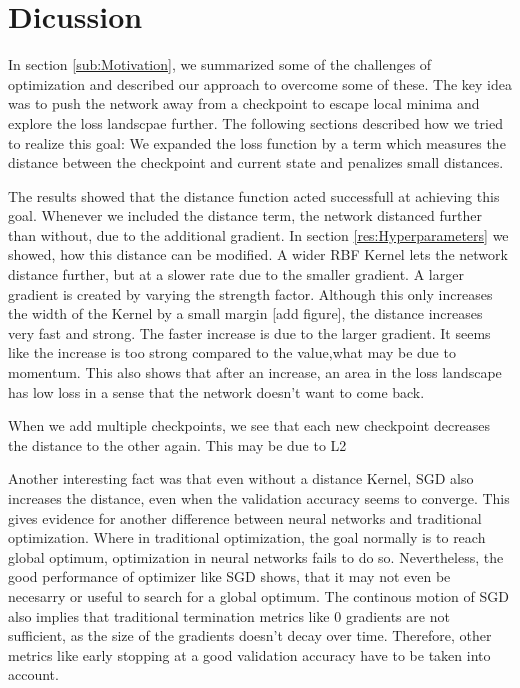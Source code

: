 \chapter{Dicussion}

In section \ref{sub:Motivation}, we summarized some of the challenges of
optimization and described our approach to overcome some of these. The key idea
was to push the network away from a checkpoint to escape local minima and
explore the loss landscpae further. The following sections described how we
tried to realize this goal: We expanded the loss function by a term which
measures the distance between the checkpoint and current state and penalizes
small distances.

The results showed that the distance function acted successfull at achieving
this goal. Whenever we included the distance term, the network distanced further
than without, due to the additional gradient. In section
\ref{res:Hyperparameters} we showed, how this distance can be modified. A wider
RBF Kernel lets the network distance further, but at a slower rate due to the
smaller gradient. A larger gradient is created by varying the strength factor.
Although this only increases the width of the Kernel by a small margin [add
figure], the distance increases very fast and strong. The faster increase is due
to the larger gradient. It seems like the increase is too strong compared to the
value,what may be due to momentum. This also shows that after an increase, an
area in the loss landscape has low loss in a sense that the network doesn't
want to come back.

When we add multiple checkpoints, we see that each new checkpoint decreases the
distance to the other again. This may be due to L2






Another interesting fact was that even without a distance Kernel,
SGD also increases the distance, even when the validation accuracy seems to
converge. This gives evidence for another difference between neural networks and
traditional optimization. Where in traditional optimization, the goal normally
is to reach global optimum, optimization in neural networks fails to do so.
Nevertheless, the good performance of optimizer like SGD shows, that it may not
even be necesarry or useful to search for a global optimum. The continous motion
of SGD also implies that traditional termination metrics like 0 gradients are
not sufficient, as the size of the gradients doesn't decay over time. Therefore,
other metrics like early stopping at a good validation accuracy have to be taken
into account.

